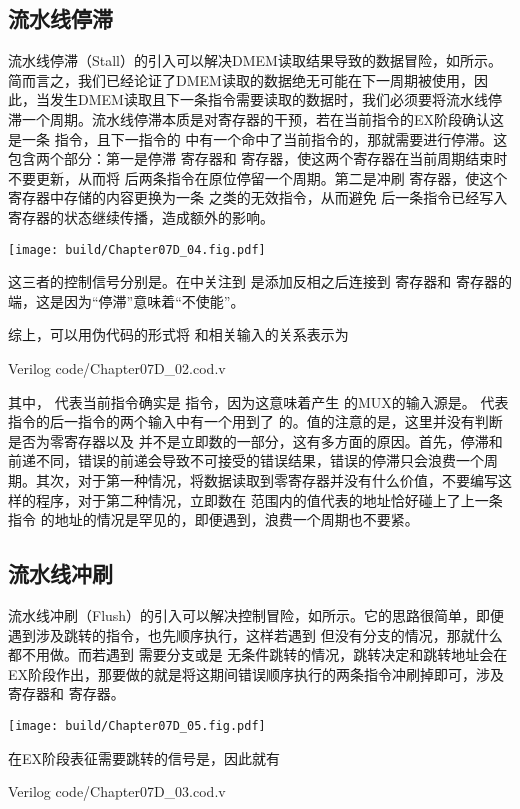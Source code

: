 \subsection{流水线停滞}
流水线停滞（Stall）的引入可以解决DMEM读取结果导致的数据冒险，如所示。简而言之，我们已经论证了DMEM读取的数据绝无可能在下一周期被使用，因此，当发生DMEM读取且下一条指令需要读取的数据时，我们必须要将流水线停滞一个周期。流水线停滞本质是对寄存器的干预，若在当前指令的EX阶段确认这是一条 指令，且下一指令的 中有一个命中了当前指令的，那就需要进行停滞。这包含两个部分：第一是停滞 寄存器和 寄存器，使这两个寄存器在当前周期结束时不要更新，从而将 后两条指令在原位停留一个周期。第二是冲刷 寄存器，使这个寄存器中存储的内容更换为一条 之类的无效指令，从而避免 后一条指令已经写入 寄存器的状态继续传播，造成额外的影响。
\begin{Figure}[流水线停滞]
    \texttt{[image: build/Chapter07D\_04.fig.pdf]}
\end{Figure}

这三者的控制信号分别是。在中关注到 是添加反相之后连接到 寄存器和 寄存器的 端，这是因为“停滞”意味着“不使能”。

综上，可以用伪代码的形式将 和相关输入的关系表示为
\begin{Code}[流水线停滞的伪代码表示]{Verilog}
    code/Chapter07D_02.cod.v
\end{Code}
其中， 代表当前指令确实是 指令，因为这意味着产生 的MUX的输入源是。 代表 指令的后一指令的两个输入中有一个用到了 的。值的注意的是，这里并没有判断 是否为零寄存器以及 并不是立即数的一部分，这有多方面的原因。首先，停滞和前递不同，错误的前递会导致不可接受的错误结果，错误的停滞只会浪费一个周期。其次，对于第一种情况，将数据读取到零寄存器并没有什么价值，不要编写这样的程序，对于第二种情况，立即数在 范围内的值代表的地址恰好碰上了上一条指令 的地址的情况是罕见的，即便遇到，浪费一个周期也不要紧。

\subsection{流水线冲刷}
流水线冲刷（Flush）的引入可以解决控制冒险，如所示。它的思路很简单，即便遇到涉及跳转的指令，也先顺序执行，这样若遇到 但没有分支的情况，那就什么都不用做。而若遇到 需要分支或是 无条件跳转的情况，跳转决定和跳转地址会在EX阶段作出，那要做的就是将这期间错误顺序执行的两条指令冲刷掉即可，涉及 寄存器和 寄存器。
\begin{Figure}[流水线冲刷]
    \texttt{[image: build/Chapter07D\_05.fig.pdf]}
\end{Figure}
在EX阶段表征需要跳转的信号是，因此就有
\begin{Code}[流水线冲刷的伪代码表示]{Verilog}
    code/Chapter07D_03.cod.v
\end{Code}

